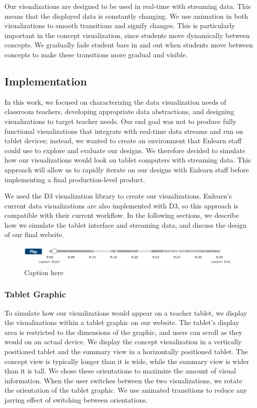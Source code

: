 \documentclass{sigchi}
\begin{document}
Our visualizations are designed to be used in real-time with streaming data. This means that the displayed data is constantly changing. We use animation in both visualizations to smooth transitions and signify changes. This is particularly important in the concept visualization, since students move dynamically between concepts. We gradually fade student bars in and out when students move between concepts to make these transitions more gradual and visible. %



\subsection{Implementation}
In this work, we focused on characterizing the data visualization needs of classroom teachers, developing appropriate data abstractions, and designing visualizations to target teacher needs. Our end goal was not to produce fully functional visualizations that integrate with real-time data streams and run on tablet devices; instead, we wanted to create an environment that Enlearn staff could use to explore and evaluate our designs. We therefore decided to simulate how our visualizations would look on tablet computers with streaming data. This approach will allow us to rapidly iterate on our designs with Enlearn staff before implementing a final production-level product.

We used the D3 visualization library to create our visualizations. Enlearn's current data visualizations are also implemented with D3, so this approach is compatible with their current workflow. In the following sections, we describe how we simulate the tablet interface and streaming data, and discuss the design of our final website.

\begin{figure}[t]
\centering
\includegraphics[width=180mm]{images/Timeline.pdf}
\caption{Caption here}
\label{fig:Timeline}
\end{figure}

\subsubsection{Tablet Graphic}
To simulate how our visualizations would appear on a teacher tablet, we display the visualizations within a tablet graphic on our website. The tablet's display area is restricted to the dimensions of the graphic, and users can scroll as they would on an actual device. We display the concept visualization in a vertically positioned tablet and the summary view in a horizontally positioned tablet. The concept view is typically longer than it is wide, while the summary view is wider than it is tall. We chose these orientations to maximize the amount of visual information. When the user switches between the two visualizations, we rotate the orientation of the tablet graphic. We use animated transitions to reduce any jarring effect of switching between orientations.
\end{document}
